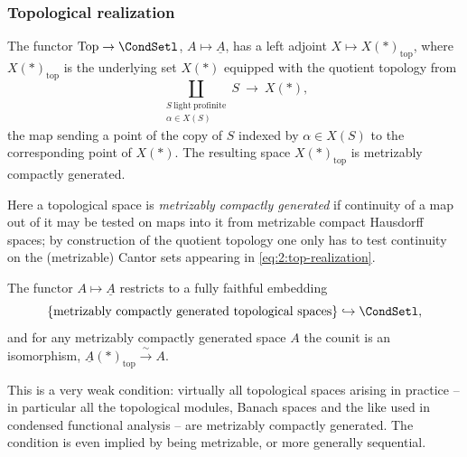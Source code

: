 \subsubsection*{Topological realization}

\begin{proposition}
\label{prop:2:top-realization}
The functor $\mathrm{Top}\to\CondSetl$, $A\mapsto\underline{A}$, has a left
adjoint $X\mapsto X(\ast)_{\mathrm{top}}$, where $X(\ast)_{\mathrm{top}}$ is the
underlying set $X(\ast)$ equipped with the quotient topology from
\begin{equation}
\label{eq:2:top-realization}
\coprod_{\substack{S\ \mathrm{light\ profinite}\\ \alpha\in X(S)}} S\
\longrightarrow\ X(\ast),
\end{equation}
the map sending a point of the copy of $S$ indexed by $\alpha\in X(S)$ to the
corresponding point of $X(\ast)$. The resulting space $X(\ast)_{\mathrm{top}}$ is
metrizably compactly generated.
\end{proposition}

Here a topological space is \emph{metrizably compactly generated} if continuity
of a map out of it may be tested on maps into it from metrizable compact
Hausdorff spaces; by construction of the quotient topology one only has to test
continuity on the (metrizable) Cantor sets appearing in
\eqref{eq:2:top-realization}.

\begin{corollary}
\label{cor:2:top-fully-faithful}
The functor $A\mapsto\underline{A}$ restricts to a fully faithful embedding
\[
\{\text{metrizably compactly generated topological spaces}\}\hookrightarrow
\CondSetl,
\]
and for any metrizably compactly generated space $A$ the counit is an
isomorphism, $\underline{A}(\ast)_{\mathrm{top}}\xrightarrow{\ \sim\ }A$.
\end{corollary}

This is a very weak condition: virtually all topological spaces arising in
practice -- in particular all the topological modules, Banach spaces and the
like used in condensed functional analysis -- are metrizably compactly
generated. The condition is even implied by being metrizable, or more generally
sequential.

